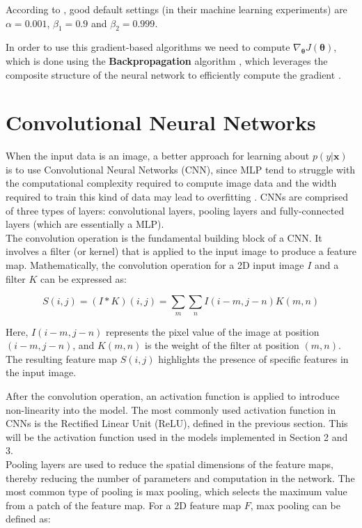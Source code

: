 According to \cite{kingma2017}, good default settings (in their machine learning experiments) are $\alpha=0.001$, $\beta_1=0.9$ and $\beta_2 = 0.999$.

In order to use this gradient-based algorithms we need to compute $\nabla_{\boldsymbol{\theta}} J(\boldsymbol{\theta})$, which is done using the \textbf{Backpropagation} algorithm \cite{rumelhart1986}, which leverages the composite structure of the neural network to efficiently compute the gradient \cite{damadi2023}.

\section{Convolutional Neural Networks}

When the input data is an image, a better approach for learning about $p(y | \mathbf{x})$ is to use Convolutional Neural Networks (CNN), since MLP tend to struggle with the computational complexity required to compute image data and the width required to train this kind of data may lead to overfitting \cite{oshea2015}. CNNs are comprised of three types of layers: convolutional layers, pooling layers and fully-connected layers (which are essentially a MLP).\\

The convolution operation is the fundamental building block of a CNN. It involves a filter (or kernel) that is applied to the input image to produce a feature map. Mathematically, the convolution operation for a 2D input image \( I \) and a filter \( K \) can be expressed as:

\begin{equation*}
S(i, j) = (I * K)(i, j) = \sum_{m} \sum_{n} I(i-m, j-n) K(m, n)
\end{equation*}

Here, \( I(i-m, j-n) \) represents the pixel value of the image at position \((i-m, j-n)\), and \( K(m, n) \) is the weight of the filter at position \((m, n)\). The resulting feature map \( S(i, j) \) highlights the presence of specific features in the input image.

After the convolution operation, an activation function is applied to introduce non-linearity into the model. The most commonly used activation function in CNNs is the Rectified Linear Unit (ReLU), defined in the previous section. This will be the activation function used in the models implemented in Section 2 and 3.\\
Pooling layers are used to reduce the spatial dimensions of the feature maps, thereby reducing the number of parameters and computation in the network. The most common type of pooling is max pooling, which selects the maximum value from a patch of the feature map. For a 2D feature map \( F \), max pooling can be defined as:


